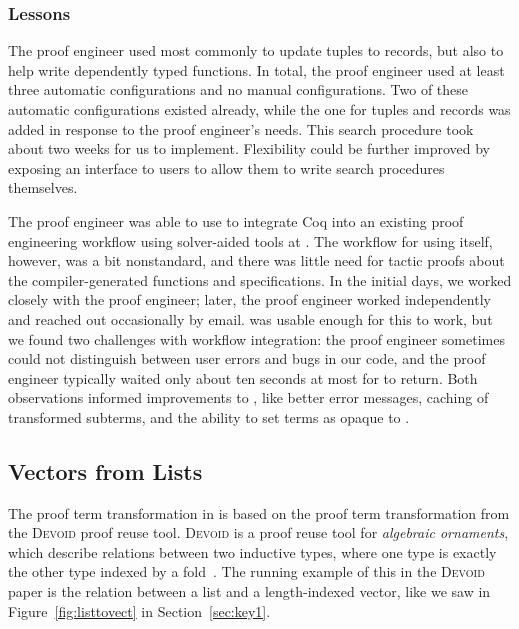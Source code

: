 \subsubsection{Lessons}

The proof engineer used \toolname most commonly to update tuples to records,
but also to help write dependently typed functions.
In total, the proof engineer used at least three automatic configurations and no manual configurations.
Two of these automatic configurations existed already, while the one for tuples and records was
added in response to the proof engineer's needs.
This search procedure took about two weeks for us to implement. %
Flexibility could be further improved by exposing an interface to users to allow them to
write search procedures themselves.

The proof engineer was able to use \toolname to integrate Coq into an existing proof engineering
workflow using solver-aided tools at \company.
The workflow for using \toolname itself, however, was a bit nonstandard,
and there was little need for tactic proofs about the compiler-generated functions and specifications.
In the initial days, we worked closely with the proof engineer;
later, the proof engineer worked independently and reached out occasionally by email.
\toolname was usable enough for this to work, but we found two challenges with workflow integration:
the proof engineer sometimes could not distinguish between user errors and bugs in our code,
and the proof engineer typically waited only about ten seconds at most for \toolname to return.
Both observations informed improvements to \toolname, like better error messages, caching of transformed subterms,
and the ability to set terms as opaque to \toolname.

\subsection{Vectors from Lists}
\label{sec:dep}

The proof term transformation in \toolname is based on the proof term transformation from
the \textsc{Devoid} proof reuse tool.
\textsc{Devoid} is a proof reuse tool for \textit{algebraic ornaments}, which describe relations
between two inductive types, where one type is exactly the other type indexed by a fold~\cite{mcbride}.
The running example of this in the \textsc{Devoid} paper is the relation between a list and a
length-indexed vector, like we saw in Figure~\ref{fig:listtovect} in Section~\ref{sec:key1}.

